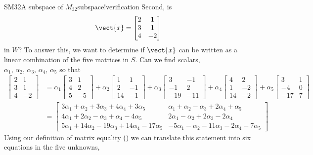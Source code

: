 \begin{example}{SM32}{A subspace of $M_{32}$}{subspace!verification}
%
Second, is
%
\begin{equation*}
\vect{x}=\begin{bmatrix}
2 & 1 \\ 3 & 1 \\ 4 & -2
\end{bmatrix}
\end{equation*}
%
in $W$?  To answer this, we want to determine if $\vect{x}$ can be written as a linear combination of the five matrices in $S$.  Can we find scalars, $\alpha_1,\,\alpha_2,\,\alpha_3,\,\alpha_4,\,\alpha_5$ so that
%
\begin{align*}
\begin{bmatrix}
2 & 1 \\ 3 & 1 \\ 4 & -2
\end{bmatrix}
&=
\alpha_1
\begin{bmatrix}
3 & 1 \\ 4 & 2 \\ 5 & -5
\end{bmatrix}
+\alpha_2
\begin{bmatrix}
1 & 1 \\ 2 & -1 \\ 14 & -1
\end{bmatrix}
+\alpha_3
\begin{bmatrix}
3 & -1 \\ -1 & 2 \\ -19 & -11
\end{bmatrix}
+\alpha_4
\begin{bmatrix}
4 & 2 \\ 1 & -2 \\ 14 & -2
\end{bmatrix}
+\alpha_5
\begin{bmatrix}
3 & 1 \\ -4 & 0 \\ -17 & 7
\end{bmatrix}\\
%
&=
\begin{bmatrix}
3\alpha_1 +\alpha_2 +3\alpha_3 +4\alpha_4 +3\alpha_5 &
\alpha_1 +\alpha_2 -\alpha_3 +2\alpha_4 +\alpha_5\\
4\alpha_1 +2\alpha_2 -\alpha_3 +\alpha_4 -4\alpha_5&
2\alpha_1 -\alpha_2 +2\alpha_3 -2\alpha_4 \\
5\alpha_1 +14\alpha_2 -19\alpha_3 +14\alpha_4 -17\alpha_5&
-5\alpha_1 -\alpha_2 -11\alpha_3 -2\alpha_4 +7\alpha_5
\end{bmatrix}
\end{align*}
%
Using our definition of matrix equality () we can translate this statement into six equations in the five unknowns,

\end{example}
